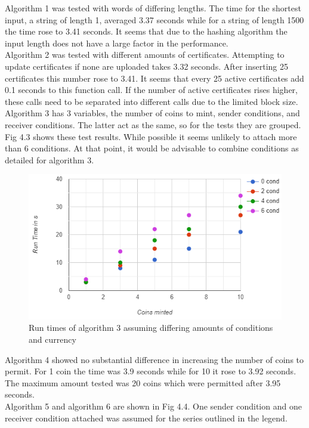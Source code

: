 Algorithm 1 was tested with words of differing lengths. The time for the shortest input, a string of length 1, averaged 3.37 seconds while for a string of length 1500 the time rose to 3.41 seconds. It seems that due to the hashing algorithm the input length does not have a large factor in the performance.\\
Algorithm 2 was tested with different amounts of certificates. Attempting to update certificates if none are uploaded takes 3.32 seconds. After inserting 25 certificates this number rose to 3.41. It seems that every 25 active certificates add 0.1 seconds to this function call. If the number of active certificates rises higher, these calls need to be separated into different calls due to the limited block size.\\
Algorithm 3 has 3 variables, the number of coins to mint, sender conditions, and receiver conditions. The latter act as the same, so for the tests they are grouped. Fig 4.3 shows these test results. While possible it seems unlikely to attach more than 6 conditions. At that point, it would be advisable to combine conditions as detailed for algorithm 3.\\
\begin{figure}[H]
    \centering
    \includegraphics[scale=0.7]{figures/4.3.png}  
    \caption{Run times of algorithm 3 assuming differing amounts of conditions and currency}
    \label{fig:testalgo3}
\end{figure}
Algorithm 4 showed no substantial difference in increasing the number of coins to permit. For 1 coin the time was 3.9 seconds while for 10 it rose to 3.92 seconds. The maximum amount tested was 20 coins which were permitted after 3.95 seconds.\\
Algorithm 5 and algorithm 6 are shown in Fig 4.4. One sender condition and one receiver condition attached was assumed for the series outlined in the legend.
